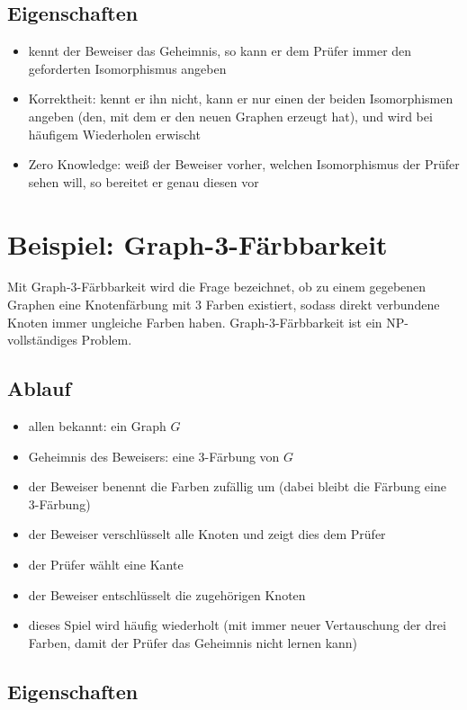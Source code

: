 \documentclass[a4paper,twoside,DIV15,BCOR12mm]{scrbook}
\begin{document}
\subsection{Eigenschaften}

\begin{itemize}
	\item kennt der Beweiser das Geheimnis, so kann er dem Prüfer immer den geforderten Isomorphismus angeben
	\item Korrektheit: kennt er ihn nicht, kann er nur einen der beiden Isomorphismen angeben (den, mit dem er den neuen Graphen erzeugt hat), und wird bei häufigem Wiederholen erwischt
	\item Zero Knowledge: weiß der Beweiser vorher, welchen Isomorphismus der Prüfer sehen will, so bereitet er genau diesen vor
\end{itemize}

\section{Beispiel: Graph-3-Färbbarkeit}

Mit Graph-3-Färbbarkeit wird die Frage bezeichnet, ob zu einem gegebenen Graphen eine Knotenfärbung mit 3 Farben existiert, sodass direkt verbundene Knoten immer ungleiche Farben haben. Graph-3-Färbbarkeit ist ein NP-vollständiges Problem.

\subsection{Ablauf}

\begin{itemize}
	\item allen bekannt: ein Graph $G$
	\item Geheimnis des Beweisers: eine 3-Färbung von $G$
	\item der Beweiser benennt die Farben zufällig um (dabei bleibt die Färbung eine 3-Färbung)
	\item der Beweiser verschlüsselt alle Knoten und zeigt dies dem Prüfer
	\item der Prüfer wählt eine Kante
	\item der Beweiser entschlüsselt die zugehörigen Knoten
	\item dieses Spiel wird häufig wiederholt (mit immer neuer Vertauschung der drei Farben, damit der Prüfer das Geheimnis nicht lernen kann)
\end{itemize}

\subsection{Eigenschaften}
\end{document}
